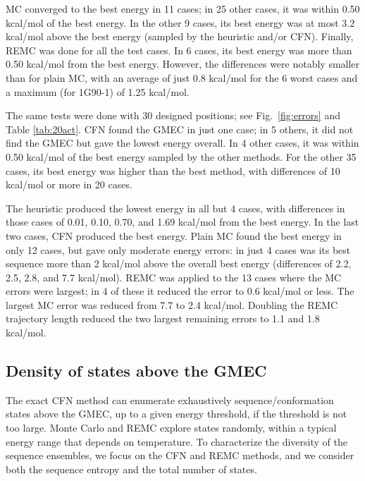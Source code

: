 \documentclass[a4paper,12pt]{article}
\begin{document}
MC converged to the best energy in 11 cases; in 25 other cases, it was within 0.50 kcal/mol of the best energy. In the
other 9 cases, its best energy was at most 3.2 kcal/mol above the best energy (sampled by the heuristic and/or CFN).
Finally, REMC was done for all the test cases. In 6 cases, its best energy was more than 0.50 kcal/mol from the best
energy. However, the differences were notably smaller than for plain MC, with an average of just 0.8 kcal/mol for the
6 worst cases and a maximum (for 1G90-1) of 1.25 kcal/mol.

The same tests were done with 30 designed positions; see Fig.\ \ref{fig:errors} and Table \ref{tab:20act}. CFN
found the GMEC in just one case; in 5 others, it did not find the GMEC but gave the lowest energy overall. In 4
other cases, it was within 0.50 kcal/mol of the best energy sampled by the other methods. For the other 35 cases,
its best energy was higher than the best method, with differences of 10 kcal/mol or more in 20 cases.

The heuristic produced the lowest energy in all but 4 cases, with differences in those cases of 0.01, 0.10, 0.70, and
1.69 kcal/mol from the best energy. In the last two cases, CFN produced the best energy. Plain MC found the best energy
in only 12 cases, but gave only moderate energy errors: in just 4 cases was its best sequence more than 2 kcal/mol above
the overall best energy (differences of 2.2, 2.5, 2.8, and 7.7 kcal/mol). REMC was applied to the 13 cases where the
MC errors were largest; in 4 of these it reduced the error to 0.6 kcal/mol or less. The largest MC error was reduced
from 7.7 to 2.4 kcal/mol. Doubling the REMC trajectory length reduced the two largest remaining errors to 1.1 and
1.8 kcal/mol.

\subsection{Density of states above the GMEC}
The exact CFN method can enumerate exhaustively sequence/conformation states above the GMEC, up to a given energy
threshold, if the threshold is not too large. Monte Carlo and REMC explore states randomly, within a typical energy
range that depends on temperature. To characterize the diversity of the sequence ensembles, we focus on the CFN and
REMC methods, and we consider both the sequence entropy and the total number of states. 
\end{document}
